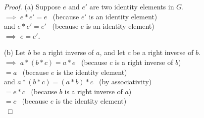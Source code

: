 \documentclass[
  12pt,
  a4paper,
  twoside]{article}
\theoremstyle{plain}
\theoremstyle{definition}
\begin{document}
\begin{proof}
\iffalse{} {Proof. } \fi{}(a) Suppose \(e\) and \(e'\) are two identity elements in \(G\).\\
\(\implies\) \(e*e' = e\) \hfill~{(because \(e'\) is an identity element)}\\
\hspace*{0.333em}\hspace*{0.333em}\hspace*{0.333em}and \(e*e' = e'\) \hfill~{(because \(e\) is an identity element)}\\
\(\implies\) \(e=e'\).

\(\)(b) Let \(b\) be a right inverse of \(a\), and let \(c\) be a right inverse of \(b\).\\
\(\implies\) \(a*(b*c) = a*e\) \hfill~{(because \(c\) is a right inverse of \(b\))}\\
\hspace*{0.333em}\hspace*{0.333em}\hspace*{0.333em}\hspace*{0.333em}\hspace*{0.333em}\hspace*{0.333em}\hspace*{0.333em}\hspace*{0.333em}\hspace*{0.333em} \(= a\) \hfill~{(because \(e\) is the identity element)}\\
\hspace*{0.333em}\hspace*{0.333em}\hspace*{0.333em}and \(a*(b*c) = (a*b)*c\) \hfill~{(by associativity)}\\
\hspace*{0.333em}\hspace*{0.333em}\hspace*{0.333em}\hspace*{0.333em}\hspace*{0.333em}\hspace*{0.333em}\hspace*{0.333em}\hspace*{0.333em}\hspace*{0.333em} \(= e*c\) \hfill~{(because \(b\) is a right inverse of \(a\))}\\
\hspace*{0.333em}\hspace*{0.333em}\hspace*{0.333em}\hspace*{0.333em}\hspace*{0.333em}\hspace*{0.333em}\hspace*{0.333em}\hspace*{0.333em}\hspace*{0.333em} \(= c\) \hfill~{(because \(e\) is the identity element)}\\

\end{proof}
\end{document}
